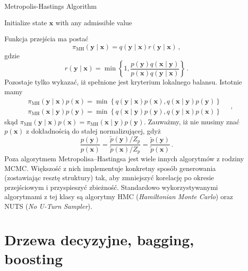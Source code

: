\documentclass{myclass}
\begin{document}
\begin{algorithm}[ht]
\caption{Metropolis-Hastings Algorithm}
\SetAlgoLined
{}

Initialize state $\bm{x}$ with any admissible value\;
\end{algorithm}

Funkcja przejścia ma postać
\[
\pi_\text{MH}(\bm{y}\mid\bm{x}) = q(\bm{y} \mid \bm{x}) r(\bm{y} \mid \bm{x})\,,
\]
gdzie
\[
    r(\bm{y} \mid \bm{x}) = \min\left\{1, \frac{p(\bm{y})q(\bm{x}\mid\bm{y})}{p(\bm{x})q(\bm{y}\mid\bm{x})}\right\}\,.
\]
Pozostaje tylko wykazać, iż spełnione jest kryterium lokalnego balansu. Istotnie mamy
\[
\begin{split}
&\pi_\text{MH}(\bm{y}\mid\bm{x})p(\bm{x}) = \min\left\{q(\bm{y}\mid\bm{x})p(\bm{x}), q(\bm{x}\mid\bm{y})p(\bm{y})\right\}\\
&\pi_\text{MH}(\bm{x}\mid\bm{y})p(\bm{y}) = \min\left\{q(\bm{x}\mid\bm{y})p(\bm{y}), q(\bm{y}\mid\bm{x})p(\bm{x})\right\}
\end{split}\quad,
\]
skąd \(\pi_\text{MH}(\bm{y}\mid\bm{x})p(\bm{x}) = \pi_\text{MH}(\bm{x}\mid\bm{y})p(\bm{y})\).
Zauważmy, iż nie musimy znać \(p(\bm{x})\) z dokładnością do stałej normalizującej, gdyż
\[
\frac{p(\bm{y})}{p(\bm{x})} = \frac{\tilde{p}(\bm{y})/Z_p}{\tilde{p}(\bm{x})/Z_p} = \frac{\tilde{p}(\bm{y})}{\tilde{p}(\bm{x})}\,.
\]
Poza algorytmem Metropolisa--Hastingsa jest wiele innych algorytmów z rodziny MCMC. Większość z nich
implementuje konkretny sposób generowania (zostawiając resztę struktury) tak, aby zmniejszyć
korelację po okresie przejściowym i przyspieszyć zbieżność. Standardowo wykorzystywanymi algorytmami
z tej klasy są algorytmy HMC (\emph{Hamiltonian Monte Carlo}) oraz NUTS (\emph{No U-Turn
Sampler}).


\section{Drzewa decyzyjne, bagging, boosting}
\end{document}
